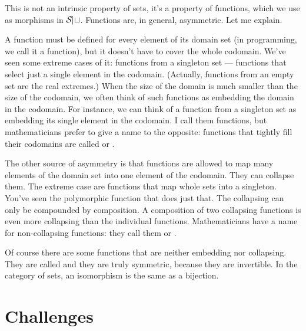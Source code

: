 This is not an intrinsic property of sets, it's a property of functions,
which we use as morphisms in $\mathcal{S\mkern-3mu et}$. Functions are, in general,
asymmetric. Let me explain.

A function must be defined for every element of its domain set (in
programming, we call it a  function), but it doesn't have to
cover the whole codomain. We've seen some extreme cases of it: functions
from a singleton set --- functions that select just a single element in
the codomain. (Actually, functions from an empty set are the real
extremes.) When the size of the domain is much smaller than the size of
the codomain, we often think of such functions as embedding the domain
in the codomain. For instance, we can think of a function from a
singleton set as embedding its single element in the codomain. I call
them  functions, but mathematicians prefer to give a
name to the opposite: functions that tightly fill their codomains are
called  or .

The other source of asymmetry is that functions are allowed to map many
elements of the domain set into one element of the codomain. They can
collapse them. The extreme case are functions that map whole sets into a
singleton. You've seen the polymorphic  function that does
just that. The collapsing can only be compounded by composition. A
composition of two collapsing functions is even more collapsing than the
individual functions. Mathematicians have a name for non-collapsing
functions: they call them  or .

Of course there are some functions that are neither embedding nor
collapsing. They are called  and they are truly
symmetric, because they are invertible. In the category of sets, an
isomorphism is the same as a bijection.

\section{Challenges}

